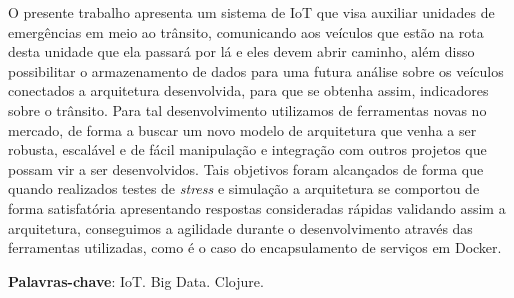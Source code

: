 \setlength{\absparsep}{18pt} %
\begin{resumo}
O presente trabalho apresenta um sistema de IoT que visa auxiliar unidades de emergências em meio ao trânsito, comunicando aos veículos que estão na rota desta unidade que ela passará por lá e eles devem abrir caminho, além disso possibilitar o armazenamento de dados para uma futura análise sobre os veículos conectados a arquitetura desenvolvida, para que se obtenha assim, indicadores sobre o trânsito. Para tal desenvolvimento utilizamos de ferramentas novas no mercado, de forma a buscar um novo modelo de arquitetura que venha a ser robusta, escalável e de fácil manipulação e integração com outros projetos que possam vir a ser desenvolvidos. Tais objetivos foram alcançados de forma que quando realizados testes de \textit{stress} e simulação a arquitetura se comportou de forma satisfatória apresentando respostas consideradas rápidas validando assim a arquitetura, conseguimos a agilidade durante o desenvolvimento através das ferramentas utilizadas, como é o caso do encapsulamento de serviços em Docker.

 \textbf{Palavras-chave}: IoT. Big Data. Clojure.
\end{resumo}